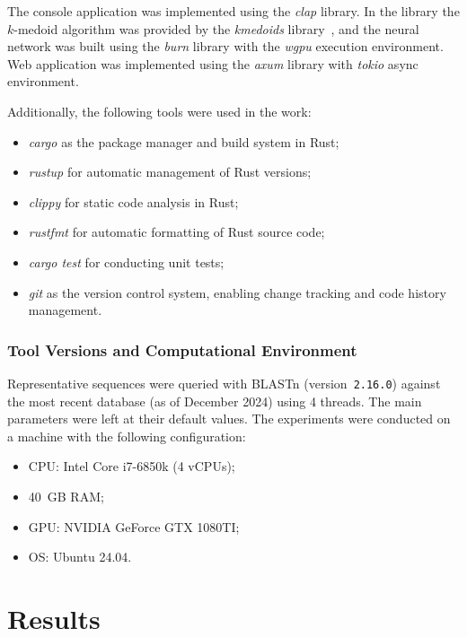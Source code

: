 \documentclass[biomedinformatics,article,submit,moreauthors]{Definitions/mdpi}
\begin{document}
            The console application was implemented using the \textit{clap} library. In the library the $k$-medoid algorithm was provided by the \textit{kmedoids} library~\citep{Rust:kmedoids}, and the neural network was built using the \textit{burn} library with the \textit{wgpu} execution environment. Web application was implemented using the \textit{axum} library with \textit{tokio} async environment.

            Additionally, the following tools were used in the work:
            \begin{itemize}
                \item \textit{cargo} as the package manager and build system in Rust;
                \item \textit{rustup} for automatic management of Rust versions;
                \item \textit{clippy} for static code analysis in Rust;
                \item \textit{rustfmt} for automatic formatting of Rust source code;
                \item \textit{cargo test} for conducting unit tests;
                \item \textit{git} as the version control system, enabling change tracking and code history management.
            \end{itemize}

            \subsubsection*{Tool Versions and Computational Environment}
            Representative sequences were queried with BLASTn (version~\texttt{2.16.0}) against the most recent database (as of December 2024) using 4 threads. 
            The main parameters were left at their default values.
            The experiments were conducted on a machine with the following configuration:
            \begin{itemize}
                \item { CPU: Intel Core i7-6850k (4 vCPUs); }
                \item { 40~GB RAM;}
                \item { GPU: NVIDIA GeForce GTX 1080TI; }
                \item { OS: Ubuntu 24.04. }
            \end{itemize}

                \section{Results}
\end{document}
